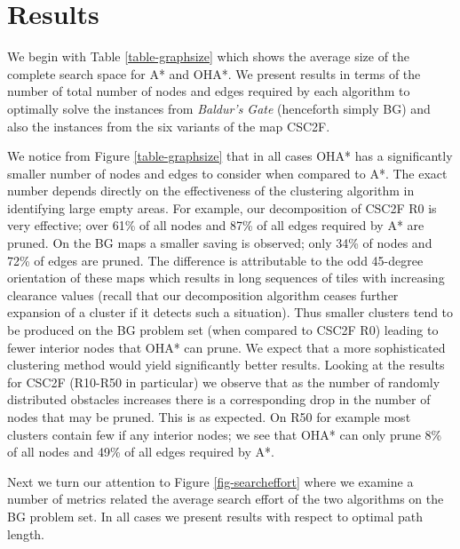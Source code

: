 \section{Results}
We begin with Table \ref{table-graphsize} which shows the average size of the complete search
space for A* and OHA*.
We present results in terms of the number of total number of nodes and edges required by each algorithm
to optimally solve the instances from \emph{Baldur's Gate} (henceforth simply BG) and also 
the instances from the six variants of the map CSC2F.

We notice from Figure \ref{table-graphsize} that in all cases OHA* has a significantly smaller number 
of nodes and edges to consider when compared to A*.
The exact number depends directly on the effectiveness of the clustering algorithm in identifying 
large empty areas.
For example, our decomposition of CSC2F R0 is very effective; over 61\% of all nodes and 87\% of all 
edges required by A* are pruned.
On the BG maps a smaller saving is observed; only 34\% of nodes and 72\% of edges are pruned.
The difference is attributable to the odd 45-degree orientation of these maps which results in 
long sequences of tiles with increasing clearance values 
(recall that our decomposition algorithm ceases further expansion of a cluster if it detects 
such a situation).
Thus smaller clusters tend to be produced on the BG problem set (when compared to CSC2F R0) leading to 
fewer interior nodes that OHA* can prune. 
We expect that a more sophisticated clustering method would yield significantly better results.
Looking at the results for CSC2F (R10-R50 in particular) we observe that as the number of 
randomly distributed obstacles increases there is a corresponding drop in the number of nodes that may be 
pruned.
This is as expected. 
On R50 for example most clusters contain few if any interior nodes; 
we see that OHA* can only prune 8\% of all nodes and 49\% of all edges required by A*.
\par
Next we turn our attention to Figure \ref{fig-searcheffort} where we examine a number of metrics
related the average search effort of the two algorithms on the BG problem set.
In all cases we present results with respect to optimal path length.
